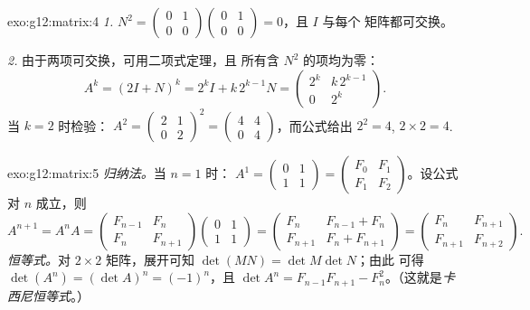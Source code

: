 \begin{solution}{exo:g12:matrix:4}
\emph{1.} $N^2 = \begin{pmatrix} 0&1\\0&0\end{pmatrix}
\begin{pmatrix} 0&1\\0&0\end{pmatrix} = 0$，且 $I$ 与每个
矩阵都可交换。

\emph{2.} 由于两项可交换，可用二项式定理，且
所有含 $N^2$ 的项均为零：
\[
A^k = (2I + N)^k = 2^k I + k\,2^{k-1} N
= \begin{pmatrix} 2^k & k\,2^{k-1}\\ 0 & 2^k \end{pmatrix}.
\]
当 $k = 2$ 时检验：
$A^2 = \begin{pmatrix} 2&1\\0&2\end{pmatrix}^2
= \begin{pmatrix} 4&4\\0&4\end{pmatrix}$，而公式给出
$2^2 = 4$, $2 \times 2 = 4$. \checkmark
\end{solution}

\begin{solution}{exo:g12:matrix:5}
\emph{归纳法。}当 $n = 1$ 时：
$A^1 = \begin{pmatrix} 0&1\\1&1\end{pmatrix}
= \begin{pmatrix} F_0 & F_1\\ F_1 & F_2\end{pmatrix}$。设公式对
$n$ 成立，则
\[
A^{n+1} = A^n A
= \begin{pmatrix} F_{n-1} & F_n\\ F_n & F_{n+1}\end{pmatrix}
\begin{pmatrix} 0 & 1\\ 1 & 1\end{pmatrix}
= \begin{pmatrix} F_n & F_{n-1} + F_n\\ F_{n+1} & F_n + F_{n+1}\end{pmatrix}
= \begin{pmatrix} F_n & F_{n+1}\\ F_{n+1} & F_{n+2}\end{pmatrix}.
\]
\emph{恒等式。}对 $2\times2$ 矩阵，展开可知
$\det(MN) = \det M \det N$；由此
可得 $\det(A^n) = (\det A)^n = (-1)^n$，且
$\det A^n = F_{n-1}F_{n+1} - F_n^2$。（这就是\emph{卡西尼恒等式}。）
\end{solution}

